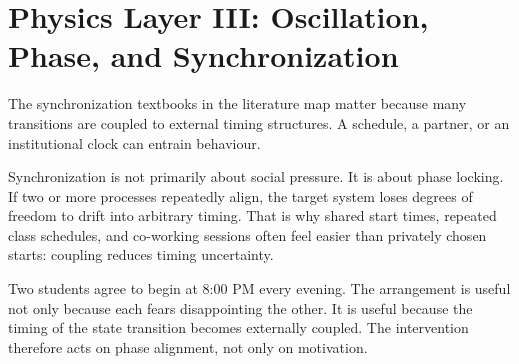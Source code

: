 \section{Physics Layer III: Oscillation, Phase, and Synchronization}

The synchronization textbooks in the literature map matter because many
transitions are coupled to external timing structures. A schedule, a partner,
or an institutional clock can entrain behaviour.

\begin{discussion}
Synchronization is not primarily about social pressure. It is about phase
locking. If two or more processes repeatedly align, the target system loses
degrees of freedom to drift into arbitrary timing. That is why shared start
times, repeated class schedules, and co-working sessions often feel easier than
privately chosen starts: coupling reduces timing uncertainty.
\end{discussion}

\begin{example}
Two students agree to begin at 8:00 PM every evening. The arrangement is useful
not only because each fears disappointing the other. It is useful because the
timing of the state transition becomes externally coupled. The intervention
therefore acts on phase alignment, not only on motivation.
\end{example}
